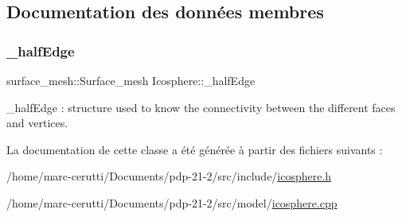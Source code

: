 \subsection{Documentation des données membres}
\mbox{\label{class_icosphere_a454cb570544ec34a65e2f3753fd3dc14}} 
\subsubsection{\texorpdfstring{\+\_\+half\+Edge}{\_halfEdge}}
{\footnotesize\ttfamily surface\+\_\+mesh\+::\+Surface\+\_\+mesh Icosphere\+::\+\_\+half\+Edge\hspace{0.3cm}{\ttfamily [private]}}



\+\_\+half\+Edge \+: structure used to know the connectivity between the different faces and vertices. 



La documentation de cette classe a été générée à partir des fichiers suivants \+:\begin{DoxyCompactItemize}
\item 
/home/marc-\/cerutti/\+Documents/pdp-\/21-\/2/src/include/\hyperlink{icosphere_8h}{icosphere.\+h}\item 
/home/marc-\/cerutti/\+Documents/pdp-\/21-\/2/src/model/\hyperlink{icosphere_8cpp}{icosphere.\+cpp}\end{DoxyCompactItemize}
